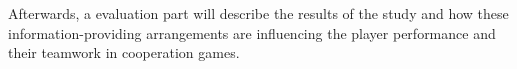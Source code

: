 Afterwards, a evaluation part will describe the results of the study
and how these information-providing arrangements are influencing the player performance and
their teamwork in cooperation games.